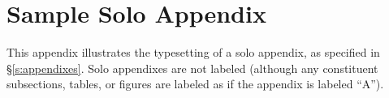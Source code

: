 \documentclass[doublespacing]{utdthesis}
\begin{document}
\appendix %

\chapter*{Sample Solo Appendix}
\label{a:other}

This appendix illustrates the typesetting of a solo appendix, as specified
in \S\ref{s:appendixes}.
Solo appendixes are not labeled (although any constituent subsections,
tables, or figures are labeled as if the appendix is labeled ``A'').



\begin{thesisbib}  %



\end{thesisbib}
\end{document}
